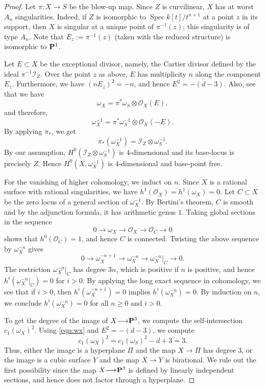 \documentclass[reqno]{amsart}
\renewcommand{\to}{{\longrightarrow}}
\renewcommand {\P}{{\bf P}}
\providecommand{\spec}{\operatorname{Spec}}
\numberwithin{equation}{section}
\renewcommand{\O}{\mathcal{O}}
\begin{document}
\begin{proof}
  Let $\pi \colon X \to S$ be the blow-up map.
  Since $Z$ is curvilinear, $X$ has at worst $A_n$ singularities.
  Indeed, if $Z$ is isomorphic to $\spec k[t]/t^{n+1}$ at a point $z$ in its support, then $X$ is singular at a unique point of $\pi^{-1}(z)$; this singularity is of type $A_n$.
  Note that $E_z := \pi^{-1}(z)$ (taken with the reduced structure) is isomorphic to $\P^1$.

  Let $E \subset X$ be the exceptional divisor, namely, the Cartier divisor defined by the ideal $\pi^{-1}\mathcal{I}_Z$.
  Over the point $z$ as above, $E$ has multiplicity $n$ along the component $E_z$.
  Furthermore, we have $(nE_z)^2 = -n$, and hence $E^2 = -(d-3)$.
  Also, see that we have
  \begin{equation}\label{eqn:wx}
    \omega_X = \pi^* \omega_{S} \otimes \O_X(E),
  \end{equation}
  and therefore,
  \[ \omega_X^{-1} = \pi^* \omega^{-1}_{S} \otimes \O_X(-E).\]
  By applying $\pi_*$, we get
  \[ \pi_* \left( \omega_X^{-1} \right) = \mathcal{I}_Z \otimes \omega_S^{-1}.\]
  By our assumption, $H^0\left(\mathcal{I}_Z \otimes \omega_S^{-1}\right)$ is $4$-dimensional and its base-locus is precisely $Z$.
  Hence $H^0\left( X, \omega_X^{-1} \right)$ is $4$-dimensional and base-point free.

  For the vanishing of higher cohomology, we induct on $n$.
  Since $X$ is a rational surface with rational singularities, we have $h^1(\O_X) = h^1(\omega_X) = 0$.
  Let $C \subset X$ be the zero locus of a general section of $\omega_X^{-1}$.
  By Bertini's theorem, $C$ is smooth and by the adjunction formula, it has arithmetic genus $1$.
  Taking global sections in the sequence
  \[ 0 \to \omega_X \to \O_X \to \O_C \to 0\]
  shows that $h^0(\O_C) = 1$, and hence $C$ is connected.
  Twisting the above sequence by $\omega_X^{-n}$ gives
  \[ 0 \to \omega_X^{-n+1} \to \omega_X^{-n} \to \omega_X^{-n}|_C \to 0.\]
  The restriction $\omega_X^{-n}|_C$ has degree $3n$, which is positive if $n$ is positive, and hence $h^i\left(\omega_X^{-n}|_C\right) = 0$ for $i > 0$.
  By applying the long exact sequence in cohomology, we see that if $i > 0$, then $h^i(\omega_X^{-n+1}) = 0$ implies $h^i(\omega_X^{-n}) = 0$.
  By induction on $n$, we conclude $h^i(\omega_X^{-n}) = 0$ for all $n \geq 0$ and $i > 0$.

  To get the degree of the image of $X \to \P^3$, we compute the self-intersection $c_1(\omega_X)^2$.
  Using \eqref{eqn:wx} and $E^2 = -(d-3)$, we compute
  \[ c_1(\omega_X)^2 = c_1(\omega_{S})^2 - d + 3 = 3.\]
  Thus, either the image is a hyperplane $\Pi$ and the map $X \to \Pi$ has degree 3, or the image is a cubic surface $Y$ and the map $X \to Y$ is birational.
  We rule out the first possibility since the map $X \to \P^3$ is defined by linearly independent sections, and hence does not factor through a hyperplane.


\end{proof}
\end{document}
